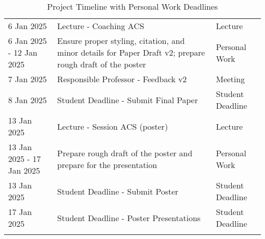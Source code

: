 \documentclass[
]{article}
\begin{document}
\begin{longtable}{p{} p{} p{}}
6 Jan 2025 & Lecture - Coaching ACS & Lecture \\

6 Jan 2025 - 12 Jan 2025 & Ensure proper styling, citation, and minor details for Paper Draft v2; prepare rough draft of the poster & Personal Work \\

7 Jan 2025 & Responsible Professor - Feedback v2 & Meeting \\

8 Jan 2025 & Student Deadline - Submit Final Paper & Student Deadline \\

13 Jan 2025 & Lecture - Session ACS (poster) & Lecture \\

13 Jan 2025 - 17 Jan 2025 & Prepare rough draft of the poster and prepare for the presentation & Personal Work \\

13 Jan 2025 & Student Deadline - Submit Poster & Student Deadline \\

17 Jan 2025 & Student Deadline - Poster Presentations & Student Deadline \\
\bottomrule
\caption{Project Timeline with Personal Work Deadlines}
\end{longtable}
\end{document}
